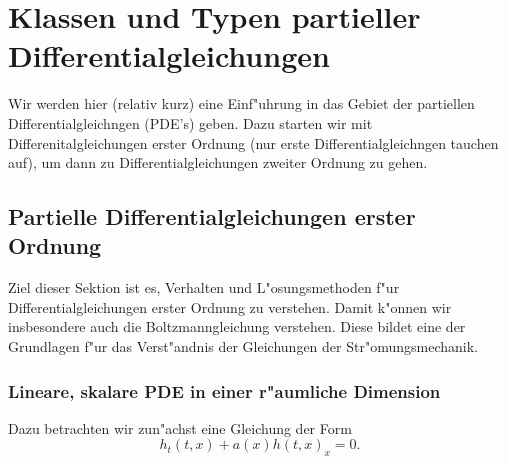 

\section{Klassen und Typen partieller Differentialgleichungen}
\par
Wir werden hier (relativ kurz) eine Einf"uhrung in das Gebiet der 
partiellen Differentialgleichngen (PDE's) geben.
Dazu starten wir mit Differenitalgleichungen erster Ordnung (nur erste 
Differentialgleichngen tauchen auf),
um dann zu Differentialgleichungen zweiter Ordnung zu gehen.
\subsection{Partielle Differentialgleichungen erster Ordnung}
Ziel dieser Sektion ist es, Verhalten und L"osungsmethoden f"ur Differentialgleichungen erster Ordnung zu verstehen. Damit 
k"onnen wir insbesondere auch die Boltzmanngleichung verstehen. 
Diese bildet eine der Grundlagen f"ur das Verst"andnis der Gleichungen der 
Str"omungsmechanik.
\subsubsection{Lineare, skalare PDE in einer r"aumliche Dimension}\par
 Dazu betrachten wir zun"achst 
eine Gleichung der Form
$$ h_t(t,x) + a(x)h(t,x)_x =0.$$


